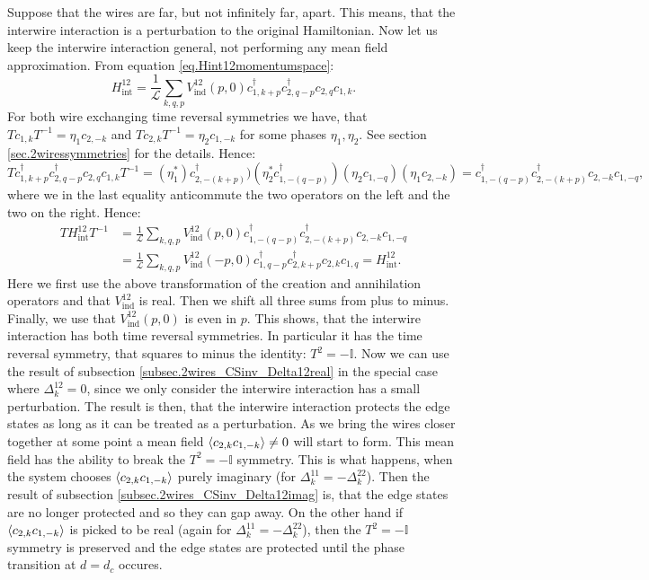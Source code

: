 Suppose that the wires are far, but not infinitely far, apart. This means, that the interwire interaction is a perturbation to the original Hamiltonian. Now let us keep the interwire interaction general, not performing any mean field approximation. From equation \eqref{eq.Hint12momentumspace}:
\begin{equation}
H_\text{int}^{12} = \frac{1}{\mathcal{L}}\sum_{k,q,p} V_{\text{ind}}^{12}(p,0) c^\dagger_{1,k + p} c^\dagger_{2, q - p} c_{2, q} c_{1, k}. \nonumber
\end{equation}
For both wire exchanging time reversal symmetries we have, that $Tc_{1, k}T^{-1} = \eta_1c_{2, -k}$ and $Tc_{2, k}T^{-1} = \eta_2c_{1, -k}$ for some phases $\eta_1, \eta_2$. See section \ref{sec.2wiressymmetries} for the details. Hence:
\begin{equation}
Tc^\dagger_{1,k + p} c^\dagger_{2, q - p} c_{2, q} c_{1, k}T^{-1} = (\eta_1^*)c^\dagger_{2,-(k + p)})(\eta_2^* c^\dagger_{1, -(q - p)})(\eta_2c_{1, -q})(\eta_1 c_{2, -k}) = c^\dagger_{1, -(q - p)}c^\dagger_{2,-(k + p)}c_{2, -k}c_{1, -q}, \nonumber 
\end{equation}
where we in the last equality anticommute the two operators on the left and the two on the right. Hence:
\begin{align}
TH_\text{int}^{12}T^{-1} &= \frac{1}{\mathcal{L}}\sum_{k,q,p} V_{\text{ind}}^{12}(p,0) c^\dagger_{1, -(q - p)}c^\dagger_{2,-(k + p)}c_{2, -k}c_{1, -q} \nonumber \\
&= \frac{1}{\mathcal{L}}\sum_{k,q,p} V_{\text{ind}}^{12}(-p,0) c^\dagger_{1, q - p}c^\dagger_{2, k + p }c_{2, k}c_{1, q} = H_\text{int}^{12}. \nonumber 
\end{align}
Here we first use the above transformation of the creation and annihilation operators and that $V_{\text{ind}}^{12}$ is real. Then we shift all three sums from plus to minus. Finally, we use that $V_{\text{ind}}^{12}(p,0)$ is even in $p$. This shows, that the interwire interaction has both time reversal symmetries. In particular it has the time reversal symmetry, that squares to minus the identity: $T^2 = -\mathbb{I}$. Now we can use the result of subsection \ref{subsec.2wires_CSinv_Delta12real} in the special case where $\Delta^{12}_k = 0$, since we only consider the interwire interaction has a small perturbation. The result is then, that the interwire interaction protects the edge states as long as it can be treated as a perturbation. As we bring the wires closer together at some point a mean field $\braket{c_{2,k}c_{1,-k}} \neq 0$ will start to form. This mean field has the ability to break the $T^2 = -\mathbb{I}$ symmetry. This is what happens, when the system chooses $\braket{c_{2,k}c_{1,-k}}$ purely imaginary (for $\Delta^{11}_k = -\Delta^{22}_k$). Then the result of subsection \ref{subsec.2wires_CSinv_Delta12imag} is, that the edge states are no longer protected and so they can gap away. On the other hand if $\braket{c_{2,k}c_{1,-k}}$ is picked to be real (again for $\Delta^{11}_k = -\Delta^{22}_k$), then the $T^2 = -\mathbb{I}$ symmetry is preserved and the edge states are protected until the phase transition at $d = d_c$ occures. 

